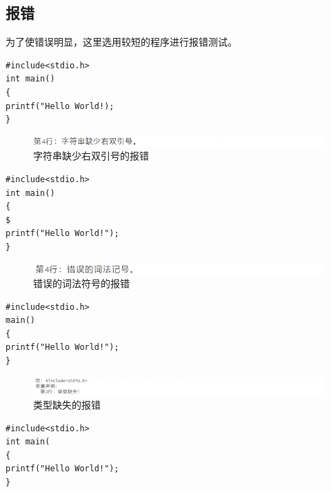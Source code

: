 \documentclass[supercite]{Experimental_Report}
\theoremstyle{definition}
\begin{document}
\subsection{报错}
为了使错误明显，这里选用较短的程序进行报错测试。

\begin{lstlisting}[title=词法错误：字符串缺少右双引号,frame=none]
#include<stdio.h>
int main()
{
printf("Hello World!);
}
\end{lstlisting}

\begin{figure}[htb]
	\begin{center}
		\includegraphics[scale=1]{images/报错1.png}
		\caption{字符串缺少右双引号的报错}
		\label{fig2-1}
	\end{center}
\end{figure}

\begin{lstlisting}[title=词法错误：错误的词法符号,frame=none]
#include<stdio.h>
int main()
{
$
printf("Hello World!");
}
\end{lstlisting}

\begin{figure}[htb]
	\begin{center}
		\includegraphics[scale=1]{images/报错3.png}
		\caption{错误的词法符号的报错}
		\label{fig2-2}
	\end{center}
\end{figure}

\begin{lstlisting}[title=语法错误：类型缺失,frame=none]
#include<stdio.h>
main()
{
printf("Hello World!");
}
\end{lstlisting}

\begin{figure}[htb]
	\begin{center}
		\includegraphics[scale=0.8]{images/报错2.png}
		\caption{类型缺失的报错}
		\label{fig2-3}
	\end{center}
\end{figure}

\begin{lstlisting}[title=语法错误：右小括号缺失,frame=none]
#include<stdio.h>
int main(
{
printf("Hello World!");
}
\end{lstlisting}
\end{document}
